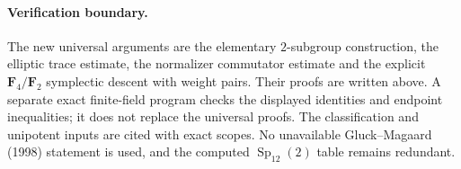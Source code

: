 \paragraph{Verification boundary.}
The new universal arguments are the elementary $2$-subgroup construction,
the elliptic trace estimate, the normalizer commutator estimate and the
explicit $\mathbf F_4/\mathbf F_2$ symplectic descent with weight pairs.
Their proofs are written above. A separate exact finite-field program
checks the displayed identities and endpoint inequalities; it does not
replace the universal proofs. The classification and unipotent inputs
are cited with exact scopes. No unavailable Gluck--Magaard (1998)
statement is used, and the computed $\operatorname{Sp}_{12}(2)$ table
remains redundant.
